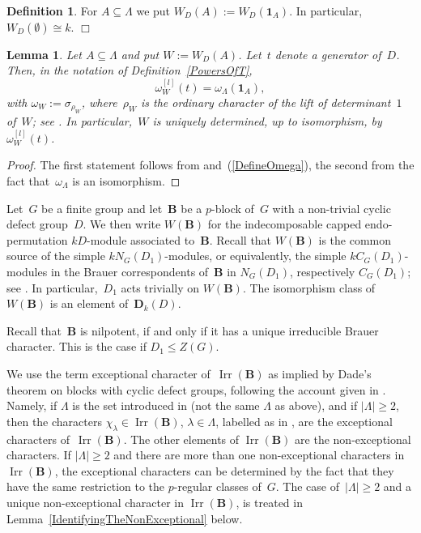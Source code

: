 \documentclass[12pt]{amsart}
\newcommand{\bB}{{\mathbf{B}}}
\newcommand{\dade}{{\mathbf{D}_k}}
\DeclareMathOperator{\Irr}{Irr}
\newtheorem{lem}[thm]{Lemma}
\theoremstyle{theorem}
\theoremstyle{definition}
\newtheorem{defn}[thm]{Definition}
\theoremstyle{remark}
\begin{document}
\begin{defn}
\label{SpecialWs}
{\rm
For $A \subseteq \Lambda$ we put $W_D(A) := W_D(\mathbf{1}_A)$.
In particular, $W_D( \emptyset ) \cong k$.
}\hfill $\Box$
\end{defn}

\begin{lem}
\label{NewNotation}
Let $A \subseteq \Lambda$ and put $W := W_D(A)$. Let~$t$ denote a
generator of~$D$. Then, in the notation of {\rm Definition~\ref{PowersOfT}},
$$\omega_W^{[l]}(t) = \omega_{\Lambda}( \mathbf{1}_A ),$$
with $\omega_W := \sigma_{\rho_W}$, where~$\rho_W$ is the ordinary character of
the lift of determinant~$1$ of~$W$; see \cite[Subsection~$3.1$]{HL24}.
In particular,~$W$ is uniquely determined, up to isomorphism, 
by~$\omega_W^{[l]}(t)$.
\end{lem}
\begin{proof}
The first statement follows from \cite[Lemme~$3.2$]{HL24} 
and~(\ref{DefineOmega}), the second from the 
fact that~$\omega_{\Lambda}$ is an isomorphism.
\end{proof}

Let~$G$ be a finite group and let~$\bB$ be a $p$-block of~$G$ with a non-trivial
cyclic defect group~$D$. We then write $W( \bB )$ for the indecomposable capped 
endo-permutation $kD$-module associated to~$\bB$. Recall that $W( \bB )$ is the 
common source of the simple $k N_G( D_1 )$-modules, or equivalently, the simple 
$kC_G(D_1)$-modules in the Brauer correspondents of~$\bB$ in $N_G( D_1 )$, 
respectively $C_G( D_1)$; see \cite[Subsection~$2.4$]{HL24}. In 
particular,~$D_1$ acts trivially on $W( \bB )$.  The isomorphism class 
of~$W( \bB )$ is an element of~$\dade(D)$. 

Recall that~$\bB$ is nilpotent, if and only if it has a unique 
irreducible Brauer character. This is the case if $D_1 \leq Z(G)$.

We use the term exceptional character of~$\Irr( \bB )$ as implied by Dade's 
theorem on blocks with cyclic defect groups, following the account given in 
\cite[Theorem~$68.1$]{DornhoffB}. Namely, if $\Lambda$ is the set introduced
in \cite[Theorem~$68.1$(2)]{DornhoffB} (not the same $\Lambda$ as above),
and if $|\Lambda| \geq 2$, then the characters $\chi_{\lambda} \in \Irr( \bB )$, 
$\lambda \in \Lambda$, labelled as in \cite[Theorem~$68.1$(5)]{DornhoffB}, are 
the exceptional characters of~$\Irr( \bB )$. The other elements of $\Irr( \bB )$
are the non-exceptional characters. If $|\Lambda| \geq 2$ and there are more than 
one non-exceptional characters in $\Irr( \bB )$, the exceptional characters can 
be determined by the fact that they have the same restriction to the $p$-regular
classes of~$G$. The case of~$|\Lambda| \geq 2$ and a unique non-exceptional
character in $\Irr( \bB )$, is treated in 
Lemma~\ref{IdentifyingTheNonExceptional} below.
\end{document}
